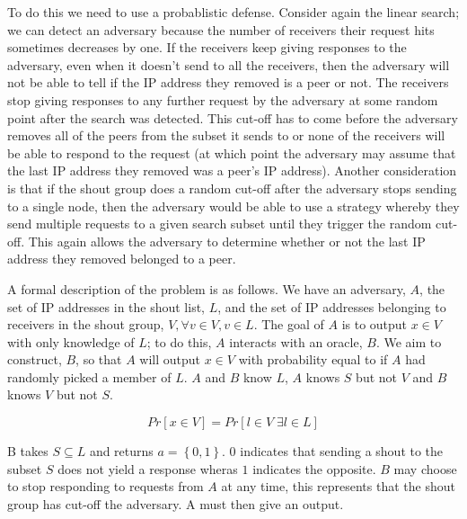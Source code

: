 \documentclass[ %
                    author={Luke Murray},
                supervisor={Dr. Simon Hollis},
                     title={Shadow Peer-to-Peer Networks},
                  subtitle={},
                    degree={MEng},
                      year={2013} ]{thesis}
\begin{document}
To do this we need to use a probablistic defense. Consider again the linear search; we can detect an adversary because the number of receivers their request hits sometimes decreases by one. If the receivers keep giving responses to the adversary, even when it doesn't send to all the receivers, then the adversary will not be able to tell if the IP address they removed is a peer or not. The receivers stop giving responses to any further request by the adversary at some random point after the search was detected. This cut-off has to come before the adversary removes all of the peers from the subset it sends to or none of the receivers will be able to respond to the request (at which point the adversary may assume that the last IP address they removed was a peer's IP address). Another consideration is that if the shout group does a random cut-off after the adversary stops sending to a single node, then the adversary would be able to use a strategy whereby they send multiple requests to a given search subset until they trigger the random cut-off. This again allows the adversary to determine whether or not the last IP address they removed belonged to a peer.

A formal description of the problem is as follows. We have an adversary, $A$, the set of IP addresses in the shout list, $L$, and the set of IP addresses belonging to receivers in the shout group, $V,\forall v \in V, v \in L$. The goal of $A$ is to output $x \in V$ with only knowledge of $L$; to do this, $A$ interacts with an oracle, $B$. We aim to construct, $B$, so that $A$ will output $x \in V$ with probability equal to if $A$ had randomly picked a member of $L$. $A$ and $B$ know $L$, $A$ knows $S$ but not $V$ and $B$ knows $V$ but not $S$.

\[Pr[x \in V] = Pr[l \in V \;\exists l \in L]\]

B takes $S \subseteq L$ and returns $a = \left\{0,1\right\}$. $0$ indicates that sending a shout to the subset $S$ does not yield a response wheras $1$ indicates the opposite. $B$ may choose to stop responding to requests from $A$ at any time, this represents that the shout group has cut-off the adversary. A must then give an output.
\end{document}
